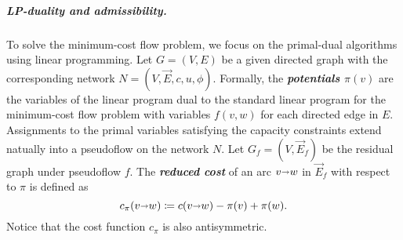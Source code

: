 \documentclass[a4paper,UKenglish]{socg-lipics-v2018}
\makeatletter
\def\note#1{\textcolor{red}{{#1}}}
\def\fsupply{\phi}
\def\arcto{\mathord\shortrightarrow}
\def\arc#1#2{#1\arcto#2}
\theoremstyle{plain}
\numberwithin{figure}{section}
\renewcommand{\paragraph}{\subparagraph}
\def\EMPH#1{\textbf{\emph{\boldmath #1}}}
\def\n@te#1{\textsf{\boldmath \textbf{$\langle\!\langle$#1$\rangle\!\rangle$}}\leavevmode}
\def\note#1{\textcolor{red}{\n@te{#1}}}
\makeatother
\begin{document}
%
%
%
%


\paragraph{LP-duality and admissibility.}
To solve the minimum-cost flow problem, we focus on the primal-dual algorithms using linear programming.
Let $G = (V,E)$ be a given directed graph with the corresponding network $N = (V,\vec{E},c,u,\fsupply)$.
Formally, the
\EMPH{potentials $\pi(v)$} are the variables of the linear program dual to the standard linear program for the minimum-cost flow problem with variables $f(v,w)$ for each directed edge in $E$.
Assignments to the primal variables satisfying the capacity constraints extend natually into a pseudoflow on the network $N$.
Let $G_f = (V,\vec{E}_f)$ be the residual graph under pseudoflow $f$.
The \EMPH{reduced cost} of an arc $\arc vw$ in $\vec{E}_f$ with respect to $\pi$ is defined as
\[
\EMPH{$c_\pi(\arc vw)$} \coloneqq c(\arc vw) - \pi(v) + \pi(w).
\]
Notice that the cost function $c_\pi$ is also antisymmetric.
\end{document}
